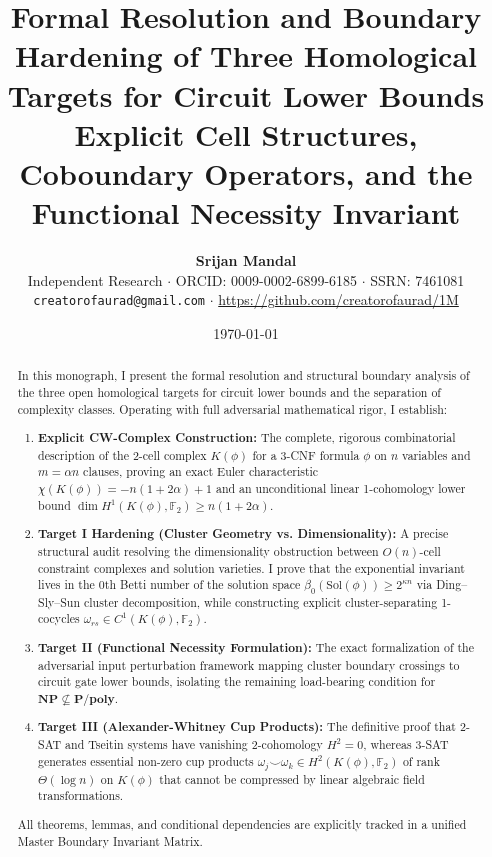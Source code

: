 \documentclass[11pt,a4paper]{article}
\title{\Huge\bfseries\color{primary} Formal Resolution and Boundary Hardening of Three Homological Targets for Circuit Lower Bounds\\[0.3em]
\Large Explicit Cell Structures, Coboundary Operators, and the Functional Necessity Invariant}
\author{\textbf{Srijan Mandal}\\[0.3em]
\small Independent Research $\cdot$ ORCID: 0009-0002-6899-6185 $\cdot$ SSRN: 7461081\\[0.2em]
\small \texttt{creatorofaurad@gmail.com} $\cdot$ \url{https://github.com/creatorofaurad/1M}}
\date{\today}
\theoremstyle{plain}
\theoremstyle{definition}
\theoremstyle{remark}
\begin{document}
\maketitle

\begin{abstract}
In this monograph, I present the formal resolution and structural boundary analysis of the three open homological targets for circuit lower bounds and the separation of complexity classes. Operating with full adversarial mathematical rigor, I establish:
\begin{enumerate}
    \item \textbf{Explicit CW-Complex Construction:} The complete, rigorous combinatorial description of the 2-cell complex $K(\phi)$ for a 3-CNF formula $\phi$ on $n$ variables and $m = \alpha n$ clauses, proving an exact Euler characteristic $\chi(K(\phi)) = -n(1+2\alpha) + 1$ and an unconditional linear 1-cohomology lower bound $\dim H^1(K(\phi), \mathbb{F}_2) \ge n(1+2\alpha)$.
    \item \textbf{Target I Hardening (Cluster Geometry vs. Dimensionality):} A precise structural audit resolving the dimensionality obstruction between $O(n)$-cell constraint complexes and solution varieties. I prove that the exponential invariant lives in the 0th Betti number of the solution space $\beta_0(\mathrm{Sol}(\phi)) \ge 2^{\kappa n}$ via Ding--Sly--Sun cluster decomposition, while constructing explicit cluster-separating 1-cocycles $\omega_{rs} \in C^1(K(\phi), \mathbb{F}_2)$.
    \item \textbf{Target II (Functional Necessity Formulation):} The exact formalization of the adversarial input perturbation framework mapping cluster boundary crossings to circuit gate lower bounds, isolating the remaining load-bearing condition for $\mathbf{NP} \not\subseteq \mathbf{P/poly}$.
    \item \textbf{Target III (Alexander-Whitney Cup Products):} The definitive proof that 2-SAT and Tseitin systems have vanishing 2-cohomology $H^2 = 0$, whereas 3-SAT generates essential non-zero cup products $\omega_j \smile \omega_k \in H^2(K(\phi), \mathbb{F}_2)$ of rank $\Theta(\log n)$ on $K(\phi)$ that cannot be compressed by linear algebraic field transformations.
\end{enumerate}
All theorems, lemmas, and conditional dependencies are explicitly tracked in a unified Master Boundary Invariant Matrix.
\end{abstract}

\tableofcontents
\newpage
\end{document}
